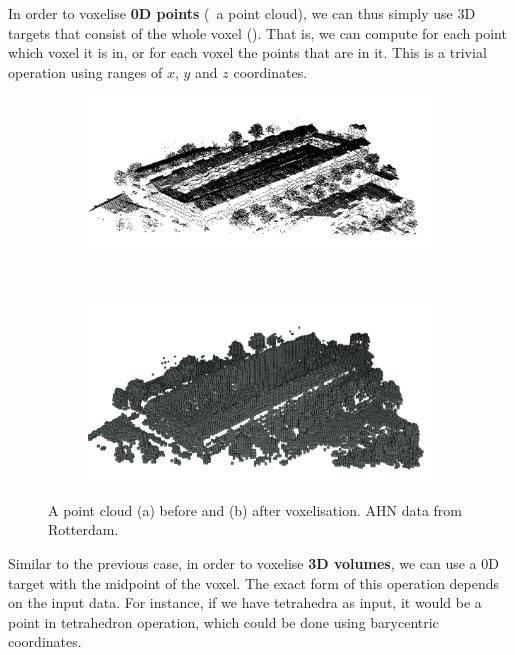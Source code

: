 In order to voxelise \textbf{0D points} (\eg\ a point cloud), we can thus simply use 3D targets that consist of the whole voxel ().
That is, we can compute for each point which voxel it is in, or for each voxel the points that are in it.
This is a trivial operation using ranges of \(x\), \(y\) and \(z\) coordinates.

\begin{figure}
\centering
\begin{subfigure}[b]{\linewidth}
\includegraphics[width=\linewidth]{figs/points-pre}
\caption{}%
\label{subfig:points-pre}
\end{subfigure}
\\
\begin{subfigure}[b]{\linewidth}
\includegraphics[width=\linewidth]{figs/points-post}
\caption{}%
\label{subfig:points-post}
\end{subfigure}
\caption{A point cloud (a) before and (b) after voxelisation. AHN data from Rotterdam.}%
\label{fig:points}
\end{figure}

Similar to the previous case, in order to voxelise \textbf{3D volumes}, we can use a 0D target with the midpoint of the voxel.
The exact form of this operation depends on the input data.
For instance, if we have tetrahedra as input, it would be a point in tetrahedron operation, which could be done using barycentric coordinates.

